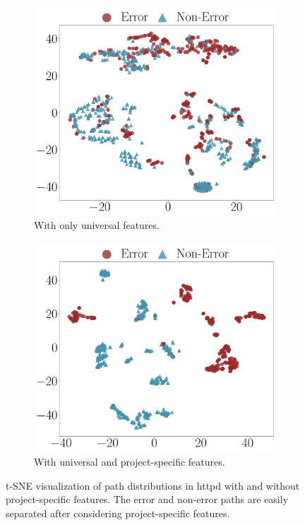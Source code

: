 \documentclass[12pt]{report}	%
\begin{document}
\begin{figure}
\centering
\begin{subfigure}[b]{0.5\textwidth}
	\centering
    \includegraphics[width=.85\linewidth]{images/httpd_uni_feats.pdf}
    \caption{With only universal features.}
     \label{fig:distri2:uni}
\end{subfigure}%
\hfill
\begin{subfigure}[b]{0.5\textwidth}
	\centering
    \includegraphics[width=.85\linewidth]{images/httpd_all_feats.pdf}
    \caption{With universal and project-specific features.}
    \label{fig:distri2:all}
\end{subfigure}
\caption[t-SNE visualization of path distributions in httpd]{t-SNE visualization of path distributions in httpd with and without project-specific features.
The error and non-error paths are easily separated after considering project-specific features.}
\label{fig:distri2}
\end{figure}
\end{document}
